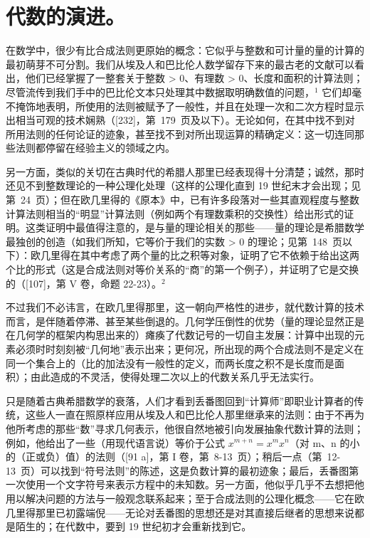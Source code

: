 \chapter{代数的演进。}

在数学中，很少有比合成法则更原始的概念：它似乎与整数和可计量的量的计算的最初萌芽不可分割。我们从埃及人和巴比伦人数学留存下来的最古老的文献可以看出，他们已经掌握了一整套关于整数 \textgreater{} 0、有理数 \textgreater{} 0、长度和面积的计算法则；尽管流传到我们手中的巴比伦文本只处理其中数据取明确数值的问题，\(^{1}\) 它们却毫不掩饰地表明，所使用的法则被赋予了一般性，并且在处理一次和二次方程时显示出相当可观的技术娴熟（{[}232{]}，第~179~页及以下）。无论如何，在其中找不到对所用法则的任何论证的迹象，甚至找不到对所出现运算的精确定义：这一切连同那些法则都停留在经验主义的领域之内。

另一方面，类似的关切在古典时代的希腊人那里已经表现得十分清楚；诚然，那时还见不到整数理论的一种公理化处理（这样的公理化直到 19 世纪末才会出现；见第~24~页）；但在欧几里得的《原本》中，已有许多段落对一些其直观程度与整数计算法则相当的“明显”计算法则（例如两个有理数乘积的交换性）给出形式的证明。这类证明中最值得注意的，是与量的理论相关的那些——量的理论是希腊数学最独创的创造（如我们所知，它等价于我们的实数 \textgreater{} 0 的理论；见第~148~页以下）：欧几里得在其中考虑了两个量的比之积等对象，证明了它不依赖于给出这两个比的形式（这是合成法则对等价关系的“商”的第一个例子），并证明了它是交换的（{[}107{]}，第 V 卷，命题 22-23）。\(^{2}\)

不过我们不必讳言，在欧几里得那里，这一朝向严格性的进步，就代数计算的技术而言，是伴随着停滞、甚至某些倒退的。几何学压倒性的优势（量的理论显然正是在几何学的框架内构思出来的）瘫痪了代数记号的一切自主发展：计算中出现的元素必须时时刻刻被“几何地”表示出来；更何况，所出现的两个合成法则不是定义在同一个集合上的（比的加法没有一般性的定义，而两长度之积不是长度而是面积）；由此造成的不灵活，使得处理二次以上的代数关系几乎无法实行。

只是随着古典希腊数学的衰落，人们才看到丢番图回到“计算师”即职业计算者的传统，这些人一直在照原样应用从埃及人和巴比伦人那里继承来的法则：由于不再为他所考虑的那些“数”寻求几何表示，他很自然地被引向发展抽象代数计算的法则；例如，他给出了一些（用现代语言说）等价于公式 \(x^{m+n} = x^{m}x^{n}\)（对 m、n 的小的（正或负）值）的法则（{[}91 a{]}，第 I 卷，第~8-13~页）；稍后一点（第~12-13~页）可以找到“符号法则”的陈述，这是负数计算的最初迹象；最后，丢番图第一次使用一个文字符号来表示方程中的未知数。另一方面，他似乎几乎不去想把他用以解决问题的方法与一般观念联系起来；至于合成法则的公理化概念——它在欧几里得那里已初露端倪——无论对丢番图的思想还是对其直接后继者的思想来说都是陌生的；在代数中，要到 19 世纪初才会重新找到它。

